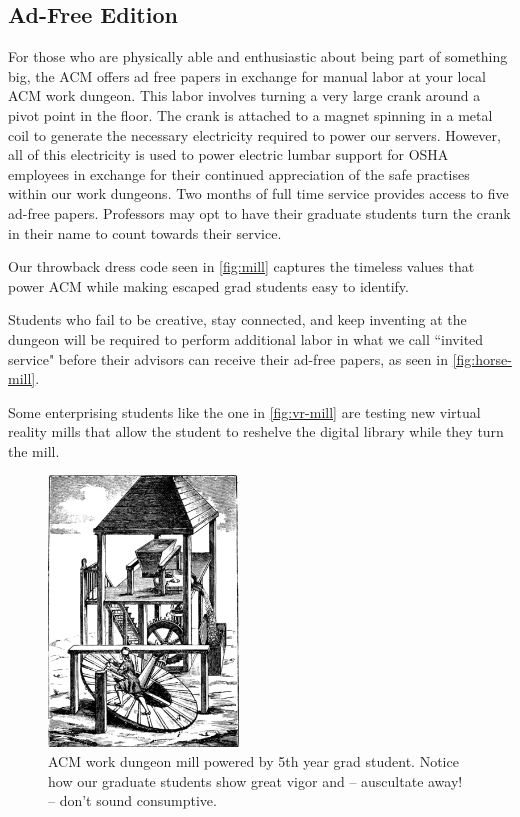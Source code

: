\subsection{Ad-Free Edition}
For those who are physically able and enthusiastic about being part of
something big, the ACM offers ad free papers in exchange for manual labor at
your local ACM work dungeon.
This labor involves turning a very large crank around a pivot point in the
floor.
The crank is attached to a magnet spinning in a metal coil to generate the
necessary electricity required to power our servers.
However, all of this electricity is used to power electric lumbar support for
OSHA employees in exchange for their continued appreciation of the safe
practises within our work dungeons.
Two months of full time service provides access to five ad-free papers.
Professors may opt to have their graduate students turn the crank in their name
to count towards their service.

Our throwback dress code seen in \autoref{fig:mill} captures the timeless
values that power ACM while making escaped grad students easy to identify.

Students who fail to be creative, stay connected, and keep inventing at the
dungeon will be required to perform additional labor in what we call ``invited
service" before their advisors can receive their ad-free papers, as seen in
\autoref{fig:horse-mill}.

Some enterprising students like the one in \autoref{fig:vr-mill} are testing
new virtual reality mills that allow the student to reshelve the digital
library while they turn the mill.

\begin{figure}
  \centering
  \includegraphics[width=0.45\textwidth]{figures/mill.png}
  \caption{ACM work dungeon mill powered by 5th year grad student. Notice how our graduate students show great vigor and -- auscultate away! -- don't sound consumptive.}
  \label{fig:mill}
\end{figure}

